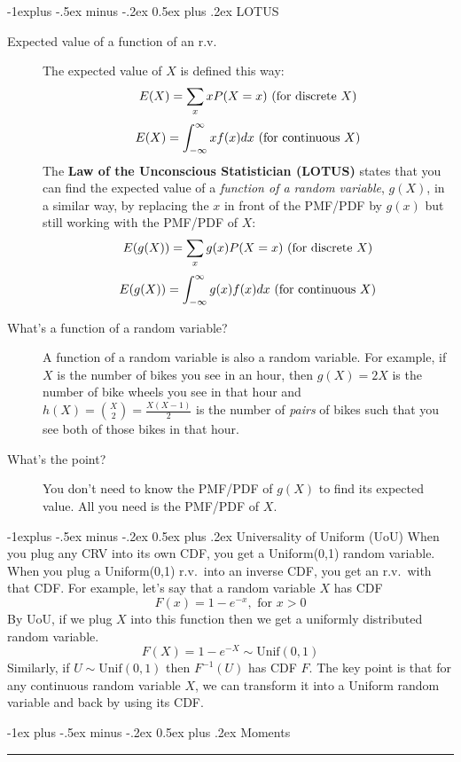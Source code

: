 \documentclass[10pt,landscape]{article}
\makeatletter
\renewcommand{\section}{\@startsection{section}{1}{0mm}%
                                {-1ex plus -.5ex minus -.2ex}%
                                {0.5ex plus .2ex}%
                                {\normalfont\large\bfseries}}
\renewcommand{\subsection}{\@startsection{subsection}{2}{0mm}%
                                {-1explus -.5ex minus -.2ex}%
                                {0.5ex plus .2ex}%
                                {\normalfont\normalsize\bfseries}}
\makeatother
\begin{document}
\begin{multicols*}{3}
\subsection{LOTUS}
\begin{description}
\item[Expected value of a function of an r.v.]
The expected value of $X$ is defined this way:
\[E(X) = \sum_x xP(X=x) \textnormal{ (for discrete $X$)}\]
\[E(X) = \int^\infty_{-\infty}xf(x)dx  \textnormal{ (for continuous $X$)}\]
The \textbf{Law of the Unconscious Statistician (LOTUS)} states that you can find the expected value of a \emph{function of a random variable}, $g(X)$, in a similar way, by replacing the $x$ in front of the PMF/PDF by $g(x)$ but still working with the PMF/PDF of $X$:
\[E(g(X)) = \sum_x g(x)P(X=x) \textnormal{ (for discrete $X$)}\]
\[E(g(X)) = \int^\infty_{-\infty}g(x)f(x)dx \textnormal{ (for continuous $X$)}\]
\item[What's a function of a random variable?] A function of a random variable is also a random variable. For example, if $X$ is the number of bikes you see in an hour, then $g(X) =  2X$ is the number of bike wheels you see in that hour and $h(X) = {X \choose 2} = \frac{X(X-1)}{2}$ is the number of \emph{pairs} of bikes such that you see both of those bikes in that hour.
\item[What's the point?] You don't need to know the PMF/PDF of $g(X)$ to find its expected value. All you need is the PMF/PDF of $X$.
\end{description}

\subsection{Universality of Uniform (UoU)} When you plug any CRV into its own CDF, you get a Uniform(0,1) random variable. When you plug a Uniform(0,1) r.v.~into an inverse CDF, you get an r.v.~with that CDF. For example, let's say that a random variable $X$ has CDF
    \[ F(x) = 1 - e^{-x}, \textrm{ for $x>0$} \]
    By  UoU, if we plug $X$ into this function then we get a uniformly distributed random variable.
    \[ F(X) = 1 - e^{-X} \sim \textrm{Unif}(0,1)\]
    Similarly, if $U \sim \textrm{Unif}(0,1)$ then $F^{-1}(U)$ has CDF $F$. The key point is that {for any continuous random variable $X$, we can transform it into a Uniform random variable and back by using its CDF.}

\section{Moments}\smallskip \hrule height 2pt \smallskip


\end{multicols*}
\end{document}
